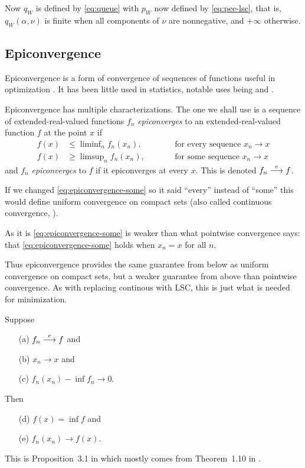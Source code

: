 Now $q_W$ is defined by \eqref{eq:queue} with $p_W$ now defined by
\eqref{eq:pee-lsc}, that is, $q_W(\alpha, \nu)$ is finite when all components
of $\nu$ are nonnegative, and $+\infty$ otherwise.

\subsection{Epiconvergence}

Epiconvergence is a form of convergence of sequences of functions useful
in optimization \citep[Chapter~7]{rockafellar-wets}.  It has been little
used in statistics, notable uses being \citet{geyer-1994-jrssb} and
\citet{constrained-m-estimation}.

Epiconvergence has multiple characterizations.  The one we shall use is
\citet[Proposition~7.2]{rockafellar-wets} a sequence of extended-real-valued
functions $f_n$ \emph{epiconverges} to an extended-real-valued function $f$
at the point $x$ if
\begin{subequations}
\begin{alignat}{2}
   f(x) & \le \liminf\nolimits_n  f_n(x_n), & \qquad &
   \text{for every sequence $x_n \to x$}
   \label{eq:epiconvergence-every}
   \\
   f(x) & \ge \limsup\nolimits_n  f_n(x_n), & \qquad &
   \text{for some sequence $x_n \to x$}
   \label{eq:epiconvergence-some}
\end{alignat}
\end{subequations}
and $f_n$ \emph{epiconverges} to $f$ if it epiconverges at every $x$.
This is denoted $f_n \stackrel{e}{\longrightarrow} f$.

If we changed \eqref{eq:epiconvergence-some} so it said ``every'' instead
of ``some'' this would define uniform convergence on compact sets
(also called continuous convergence, \citealp[Section~7.C]{rockafellar-wets}).

As it is \eqref{eq:epiconvergence-some} is weaker than what pointwise
convergence says: that \eqref{eq:epiconvergence-some} holds when $x_n = x$
for all $n$.

Thus epiconvergence provides the same guarantee from below as uniform
convergence on compact sets, but a weaker guarantee from above than
pointwise convergence.  As with replacing continous with LSC, this is
just what is needed for minimization.
\begin{theorem} \label{th:attouch}
Suppose
\begin{itemize}
\item[\normalfont (a)] $f_n \stackrel{e}{\longrightarrow} f$ and
\item[\normalfont (b)] $x_n \to x$ and
\item[\normalfont (c)] $f_n(x_n) - \inf f_n \to 0$.
\end{itemize}
Then
\begin{itemize}
\item[\normalfont (d)] $f(x) = \inf f$ and
\item[\normalfont (e)] $f_n(x_n) \to f(x)$.
\end{itemize}
\end{theorem}
This is Proposition~{3.1} in \citet{constrained-m-estimation} which
mostly comes from Theorem~{1.10} in \citet{attouch}.

